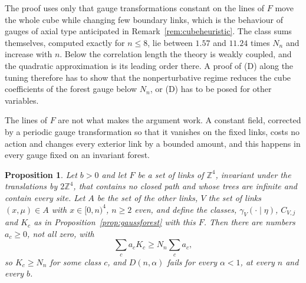 \documentclass[11pt]{amsart}
\newtheorem{proposition}[theorem]{Proposition}
\theoremstyle{definition}
\theoremstyle{remark}
\numberwithin{equation}{section}
\newcommand{\Z}{\mathbb{Z}}
\begin{document}
The proof uses only that gauge transformations constant on the lines of $F$
move the whole cube while changing few boundary links, which is the
behaviour of gauges of axial type anticipated in
Remark~\ref{rem:cubeheuristic}. The class sums themselves, computed exactly
for $n\le8$, lie between $1.57$ and $11.24$ times $N_n$ and
increase with $n$. Below the correlation length the theory is weakly
coupled, and the quadratic approximation is its leading order there. A proof
of (D) along the tuning therefore has to show that the nonperturbative
regime reduces the cube coefficients of the forest gauge below $N_n$, or
(D) has to be posed for other variables.

The lines of $F$ are not what makes the argument work. A constant field,
corrected by a periodic gauge transformation so that it vanishes on the
fixed links, costs no action and changes every exterior link by a bounded
amount, and this happens in every gauge fixed on an invariant forest.

\begin{proposition}\label{prop:gaussevery}
Let $b>0$ and let $F$ be a set of links of $\Z^4$, invariant under the
translations by $2\Z^4$, that contains no closed path and whose trees are
infinite and contain every site. Let $A$ be the set of the other links, $V$
the set of links $(x,\mu)\in A$ with $x\in[0,n)^4$, $n\ge2$ even, and define
the classes, $\gamma_V(\cdot\mid\eta)$, $C_{V,j}$ and $K_c$ as in
Proposition~\ref{prop:gaussforest} with this $F$. Then there are numbers
$a_c\ge0$, not all zero, with
\[
\sum_ca_cK_c\ge N_n\sum_ca_c ,
\]
so $K_c\ge N_n$ for some class $c$, and $D(n,\alpha)$ fails for every
$\alpha<1$, at every $n$ and every $b$.
\end{proposition}
\end{document}
